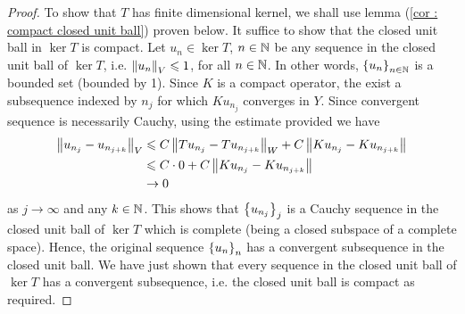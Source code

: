\documentclass[12pt]{article}
\begin{document}
\begin{proof}
    To show that $T$ has finite dimensional kernel, we shall use lemma (\ref{cor : compact closed unit ball}) proven below. It suffice to show that the closed unit ball in $\ker T$ is compact. Let $u_n \in \ker T$, $n \in \N$ be any sequence in the closed unit ball of $\ker T$, i.e. $\norm[u_n]_V \leq 1$, for all $n \in \N$. In other words,  $\set{u_n}_{n \in \N}$ is a bounded set (bounded by 1). Since $K$ is a compact operator,  the exist a subsequence indexed by $n_j$ for which $Ku_{n_j}$ converges in $Y$. Since convergent sequence is necessarily Cauchy, using the estimate provided we have
    \begin{align*}
    \norm[u_{n_j} - u_{n_{j + k}}]_V
     & \leq C \norm[T u_{n_j} - T u_{n_{j + k}}]_{W} + C \norm[K u_{n_j} - K u_{n_{j + k}}]\\
     & \leq C \cdot 0 + C \norm[K u_{n_j} - K u_{n_{j + k}}]\\
     & \to 0
    \end{align*}
    as $j \to \infty$ and any $k \in \N$. This shows that $\set{u_{n_j}}_j$ is a Cauchy sequence in the closed unit ball of $\ker T$ which is complete (being a closed subspace of a complete space). Hence, the original sequence $\set{u_n}_n$ has a convergent subsequence in the closed unit ball. We have just shown that every sequence in the closed unit ball of $\ker T$ has a convergent subsequence, i.e. the closed unit ball is compact as required. 
    
\end{proof}

%    
%    
\end{document}

